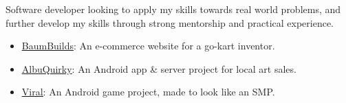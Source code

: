 \smallskip

\raggedright
{}
  Software developer looking to apply my skills towards real world problems, and further develop my skills through strong mentorship and practical experience.

  \medskip


\raggedright
{}
  \centering

  \divider
  

  \medskip


\raggedright
{}
  \centering

  \medskip


\raggedright
{}
  \begin{itemize}
    \item \href{https://baumbuilds.com}{\underline{BaumBuilds}}: An e-commerce website for a go-kart inventor.
    \item \href{https://albuquirky.github.io/}{\underline{AlbuQuirky}}: An Android app \& server project for local art sales.
    \item \href{https://augmentab.github.io/viral/}{\underline{Viral}}: An Android game project, made to look like an SMP.
  \end{itemize}

  \medskip


\raggedright
{}
  \centering
